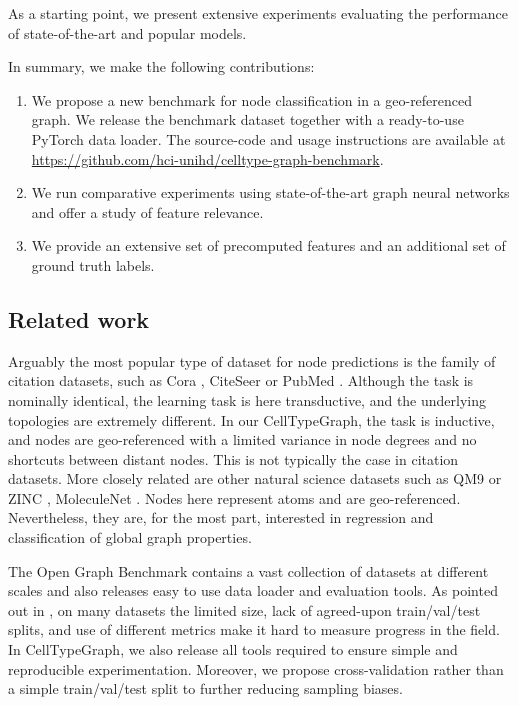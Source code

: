\documentclass[10pt,twocolumn,letterpaper]{article}
\begin{document}
As a starting point, we present extensive experiments evaluating the performance of state-of-the-art and popular models.

In summary, we make the following contributions:
\begin{enumerate}
    \item We propose a new benchmark for node classification in a geo-referenced graph. We release the benchmark dataset together with a ready-to-use PyTorch \cite{paszke2017automatic} data loader. The source-code and usage instructions are available at \url{https://github.com/hci-unihd/celltype-graph-benchmark}.
    \item We run comparative experiments using state-of-the-art graph neural networks and offer a study of feature relevance.
    \item We provide an extensive set of precomputed features and an additional set of ground truth labels.
\end{enumerate}


\subsection{Related work}

Arguably the most popular type of dataset for node predictions is the family of citation datasets, such as Cora \cite{mccallum2000automating}, CiteSeer \cite{giles1998citeseer} or PubMed \cite{sen2008collective}. 
Although the task is nominally identical, the learning task is here transductive, and the underlying topologies are extremely different. In our CellTypeGraph, the task is inductive, and nodes are geo-referenced with a limited variance in node degrees and no shortcuts between distant nodes. This is not typically the case in citation datasets.
More closely related are other natural science datasets such as QM9 \cite{rupp, blum} or ZINC \cite{gomez2018automatic}, MoleculeNet \cite{wu2018moleculenet}. Nodes here represent atoms and are geo-referenced. Nevertheless, they are, for the most part, interested in regression and classification of global graph properties.

The Open Graph Benchmark \cite{hu2020open} contains a vast collection of datasets at different scales and also releases easy to use data loader and evaluation tools. As pointed out in \cite{hu2020open}, on many datasets the limited size, lack of agreed-upon train/val/test splits, and use of different metrics make it hard to measure progress in the field. In CellTypeGraph, we also release all tools required to ensure simple and reproducible experimentation. Moreover, we propose cross-validation \cite{friedman2017elements} rather than a simple train/val/test split to further reducing sampling biases.
\end{document}
